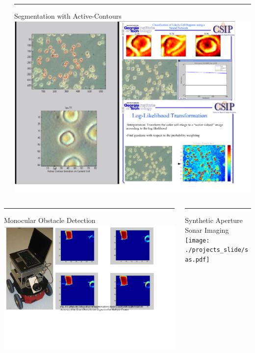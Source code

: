 \documentclass{beamer}
\begin{document}
\begin{frame}
\begin{columns}[T]
\begin{column}{.33\textwidth}
\end{column}%
\begin{column}{.33\textwidth}
\color{blue}\rule{\linewidth}{2pt}
\tiny{Segmentation with Active-Contours}
\centering
\includegraphics[scale=0.35,trim = 1 1 260 10, clip]{./Figures/cells.pdf}
\end{column}%
\end{columns}
\vspace{0.5cm} 
\begin{columns}[T] %
\begin{column}{.48\textwidth}
\color{blue}\rule{\linewidth}{2pt}
\tiny{Monocular Obstacle Detection}
\includegraphics[scale=0.40,trim = 1 1 30 10, clip]{./Figures/obs.pdf}
\end{column}%
\hfill%
\begin{column}{.48\textwidth}
\color{blue}\rule{\linewidth}{2pt}
\tiny{Synthetic Aperture Sonar Imaging}
\centering
\texttt{[image: ./projects\_slide/sas.pdf]}
\end{column}%
\end{columns}
\end{frame}
\end{document}
